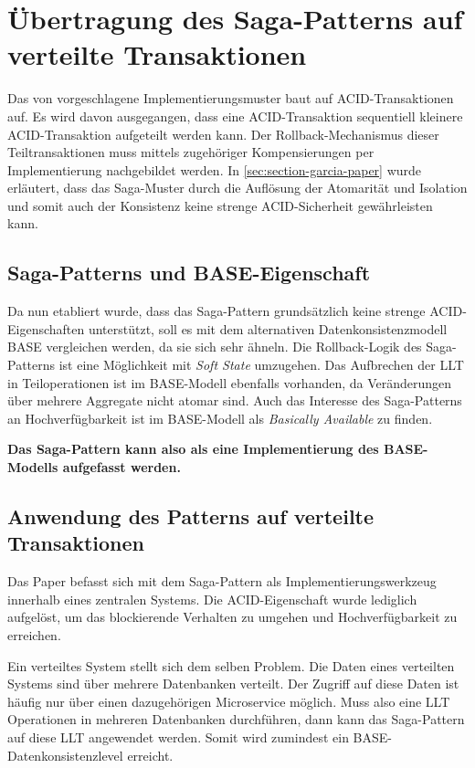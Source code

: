 \section{Übertragung des Saga-Patterns auf verteilte Transaktionen}

Das von \citeauthor{GarciaMolina.1987} vorgeschlagene Implementierungsmuster baut auf ACID-Transaktionen auf. Es wird davon ausgegangen, dass eine ACID-Transaktion sequentiell kleinere ACID-Transaktion aufgeteilt werden kann. Der Rollback-Mechanismus dieser Teiltransaktionen muss mittels zugehöriger Kompensierungen per Implementierung nachgebildet werden. In \cref{sec:section-garcia-paper} wurde erläutert, dass das Saga-Muster durch die Auflösung der Atomarität und Isolation und somit auch der Konsistenz keine strenge ACID-Sicherheit gewährleisten kann. 

\subsection{Saga-Patterns und BASE-Eigenschaft}
Da nun etabliert wurde, dass das Saga-Pattern grundsätzlich keine strenge ACID-Eigenschaften unterstützt, soll es mit dem alternativen Datenkonsistenzmodell BASE vergleichen werden, da sie sich sehr ähneln. Die Rollback-Logik des Saga-Patterns ist eine Möglichkeit mit \textit{Soft State} umzugehen. Das Aufbrechen der LLT in Teiloperationen ist im BASE-Modell ebenfalls vorhanden, da Veränderungen über mehrere Aggregate nicht atomar sind. Auch das Interesse des Saga-Patterns an Hochverfügbarkeit ist im BASE-Modell als \textit{Basically Available} zu finden. 

\textbf{Das Saga-Pattern kann also als eine Implementierung des BASE-Modells aufgefasst werden.}

\subsection{Anwendung des Patterns auf verteilte Transaktionen}
Das Paper  befasst sich mit dem Saga-Pattern als Implementierungswerkzeug innerhalb eines zentralen Systems. Die ACID-Eigenschaft wurde lediglich aufgelöst, um das blockierende Verhalten zu umgehen und Hochverfügbarkeit zu erreichen. 

Ein verteiltes System stellt sich dem selben Problem. Die Daten eines verteilten Systems sind über mehrere Datenbanken verteilt. Der Zugriff auf diese Daten ist häufig nur über einen dazugehörigen Microservice möglich. Muss also eine LLT Operationen in mehreren Datenbanken durchführen, dann kann das Saga-Pattern auf diese LLT angewendet werden. Somit wird zumindest ein BASE-Datenkonsistenzlevel erreicht. 

